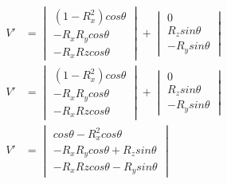 \documentclass{article}
\begin{document}
\begin{align}
        V' &=
        \begin{vmatrix} (1-R_x^2)cos\theta \\ -R_xR_ycos\theta \\ -R_xRzcos\theta \end{vmatrix} +
        \begin{vmatrix} 0\\ R_zsin\theta \\ -R_ysin\theta \end{vmatrix} \\
        V' &=
        \begin{vmatrix} (1-R_x^2)cos\theta \\ -R_xR_ycos\theta \\ -R_xRzcos\theta \end{vmatrix} +
        \begin{vmatrix} 0\\ R_zsin\theta \\ -R_ysin\theta \end{vmatrix} \\
        V' &=
        \begin{vmatrix} cos\theta-R_x^2cos\theta \\ -R_xR_ycos\theta + R_zsin\theta \\ -R_xRzcos\theta -R_ysin\theta \end{vmatrix}
    \end{align}
\end{document}
